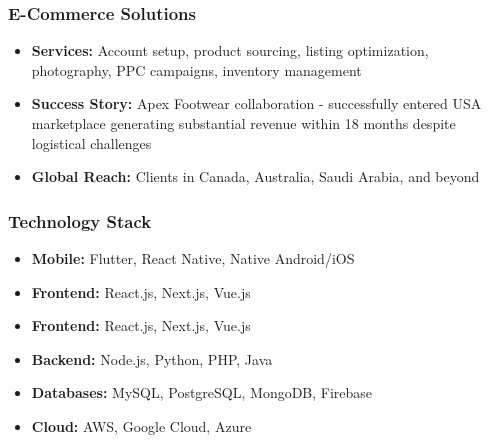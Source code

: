 \subsubsection{E-Commerce Solutions}

\begin{itemize}
    \item \textbf{Services:} Account setup, product sourcing, listing optimization, photography, PPC campaigns, inventory management
    \item \textbf{Success Story:} Apex Footwear collaboration - successfully entered USA marketplace generating substantial revenue within 18 months despite logistical challenges
    \item \textbf{Global Reach:} Clients in Canada, Australia, Saudi Arabia, and beyond
\end{itemize}

\subsubsection{Technology Stack}
\begin{itemize}
    \item \textbf{Mobile:} Flutter, React Native, Native Android/iOS
    \item \textbf{Frontend:} React.js, Next.js, Vue.js
    \item \textbf{Frontend:} React.js, Next.js, Vue.js
    \item \textbf{Backend:} Node.js, Python, PHP, Java
    \item \textbf{Databases:} MySQL, PostgreSQL, MongoDB, Firebase
    \item \textbf{Cloud:} AWS, Google Cloud, Azure
\end{itemize}
